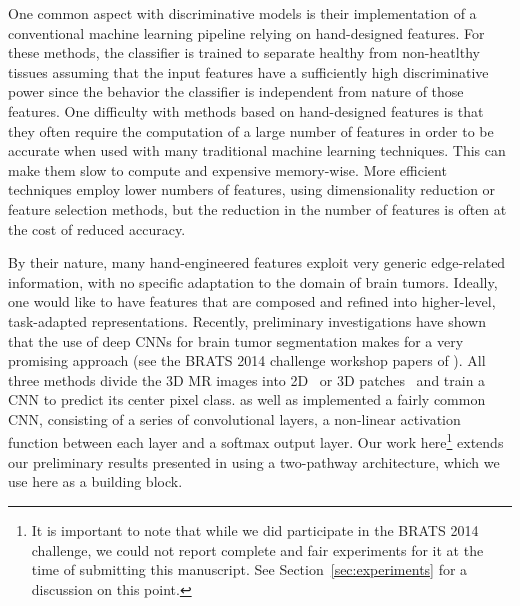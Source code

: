 \documentclass[final,5p,times,twocolumn]{elsarticle}
\begin{document}
One common aspect with discriminative models is their implementation of a conventional machine learning pipeline relying on hand-designed features. For these methods, the classifier is trained to separate healthy from non-heatlthy tissues assuming that the input features have a sufficiently high discriminative power since the behavior  the classifier is independent from nature of those features.  
One difficulty with methods based on hand-designed features is that they often require the computation of a large number of features in order to be accurate when used with many traditional machine learning techniques. This can make them slow to compute and expensive memory-wise.
More efficient techniques employ lower numbers of features, using dimensionality reduction or feature selection methods, but the reduction in the number of features is often at the cost of reduced accuracy.


By their nature, many hand-engineered features exploit very generic edge-related information, with no specific adaptation to the domain of brain tumors.  Ideally, one would like to have features that are composed and refined into higher-level, task-adapted representations. Recently, preliminary investigations have shown that the use of deep CNNs for brain tumor segmentation makes for a very promising approach (see the BRATS 2014 challenge workshop papers of \citet{Davy2014,Zikic2014,Urban2014}).   All three methods divide the 3D MR images into 2D~\citep{Davy2014,Zikic2014} or 3D patches~\citep{Urban2014} and train a CNN to predict its center pixel class. \citet{Urban2014} as well as \citet{Zikic2014} implemented a fairly common CNN, consisting of a series of convolutional layers, a non-linear activation function between each layer and a softmax output layer. Our work here\footnote{
It is important to note that while we did participate in the BRATS 2014 challenge, we could not report complete and fair experiments for it at the time of submitting this manuscript. See Section~\ref{sec:experiments} for a discussion on this point.
}
extends our preliminary results presented in \citet{Davy2014} using a two-pathway architecture, which we use here as a building block.  
\end{document}
